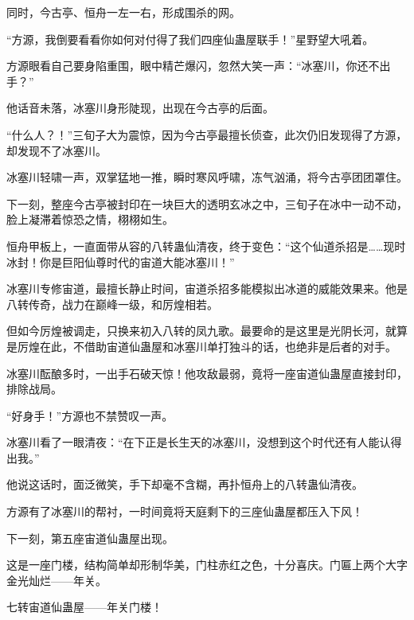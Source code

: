 \begin{this_body}
同时，今古亭、恒舟一左一右，形成围杀的网。

“方源，我倒要看看你如何对付得了我们四座仙蛊屋联手！”星野望大吼着。

方源眼看自己要身陷重围，眼中精芒爆闪，忽然大笑一声：“冰塞川，你还不出手？”

他话音未落，冰塞川身形陡现，出现在今古亭的后面。

“什么人？！”三旬子大为震惊，因为今古亭最擅长侦查，此次仍旧发现得了方源，却发现不了冰塞川。

冰塞川轻啸一声，双掌猛地一推，瞬时寒风呼啸，冻气汹涌，将今古亭团团罩住。

下一刻，整座今古亭被封印在一块巨大的透明玄冰之中，三旬子在冰中一动不动，脸上凝滞着惊恐之情，栩栩如生。

恒舟甲板上，一直面带从容的八转蛊仙清夜，终于变色：“这个仙道杀招是……现时冰封！你是巨阳仙尊时代的宙道大能冰塞川！”

冰塞川专修宙道，最擅长静止时间，宙道杀招多能模拟出冰道的威能效果来。他是八转传奇，战力在巅峰一级，和厉煌相若。

但如今厉煌被调走，只换来初入八转的凤九歌。最要命的是这里是光阴长河，就算是厉煌在此，不借助宙道仙蛊屋和冰塞川单打独斗的话，也绝非是后者的对手。

冰塞川酝酿多时，一出手石破天惊！他攻敌最弱，竟将一座宙道仙蛊屋直接封印，排除战局。

“好身手！”方源也不禁赞叹一声。

冰塞川看了一眼清夜：“在下正是长生天的冰塞川，没想到这个时代还有人能认得出我。”

他说这话时，面泛微笑，手下却毫不含糊，再扑恒舟上的八转蛊仙清夜。

方源有了冰塞川的帮衬，一时间竟将天庭剩下的三座仙蛊屋都压入下风！

下一刻，第五座宙道仙蛊屋出现。

这是一座门楼，结构简单却形制华美，门柱赤红之色，十分喜庆。门匾上两个大字金光灿烂——年关。

七转宙道仙蛊屋——年关门楼！

\end{this_body}

